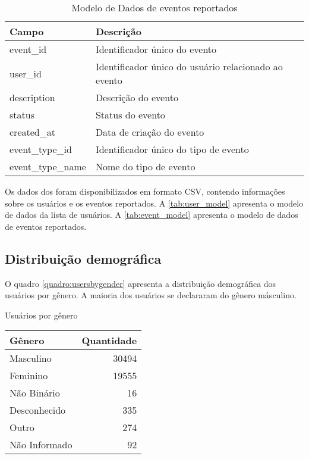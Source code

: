 \begin{table}[ht]
	\centering
	\caption{Modelo de Dados de eventos reportados}
	\label{tab:event_model}
	\begin{tabularx}{\textwidth}{|l|X|}
		\hline
		\textbf{Campo}    & \textbf{Descrição}                                   \\
		\hline
		event\_id         & Identificador único do evento                        \\
		user\_id          & Identificador único do usuário relacionado ao evento \\
		description       & Descrição do evento                                  \\
		status            & Status do evento                                     \\
		created\_at       & Data de criação do evento                            \\
		event\_type\_id   & Identificador único do tipo de evento                \\
		event\_type\_name & Nome do tipo de evento                               \\
		\hline
	\end{tabularx}
\end{table}

Os dados dos foram disponibilizados em formato CSV, contendo informações sobre os usuários e os eventos reportados. A \autoref{tab:user_model} apresenta o modelo de dados da lista de usuários. A \autoref{tab:event_model} apresenta o modelo de dados de eventos reportados.

\subsection*{Distribuição demográfica}

O quadro \autoref{quadro:usersbygender} apresenta a distribuição demográfica dos usuários por gênero. A maioria dos usuários se declararam do gênero másculino.


\begin{quadro}[htb]
	\caption{Usuários por gênero}
	\label{quadro:usersbygender}
	\centering
	\begin{tabular}{|l|r|}
		\hline
		\textbf{Gênero} & \textbf{Quantidade} \\
		\hline
		Masculino       & 30494               \\
		Feminino        & 19555               \\
		Não Binário     & 16                  \\
		Desconhecido    & 335                 \\
		Outro           & 274                 \\
		Não Informado   & 92                  \\
		\hline
	\end{tabular}
\end{quadro}

